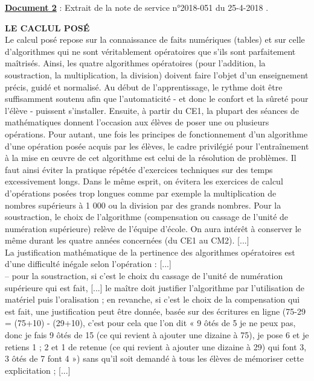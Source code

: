 \bigskip


{\bf\uline{Document 2}} : Extrait de la note de service n°2018-051 du 25-4-2018  \fg.

\begin{center}
   \begin{minipage}{15cm}
         \textsf{{\bf LE CACLUL POSÉ} \\
         Le calcul posé repose sur la connaissance de faits numériques (tables) et sur celle d'algorithmes qui ne sont véritablement opératoires que s'ils sont parfaitement maîtrisés.
Ainsi, les quatre algorithmes opératoires (pour l'addition, la soustraction, la multiplication, la division) doivent faire l'objet d'un enseignement précis, guidé et normalisé. Au début de l'apprentissage, le rythme doit être suffisamment soutenu afin que l'automaticité - et donc le confort et la sûreté pour l'élève - puissent s'installer. Ensuite, à partir du CE1, la plupart des séances de mathématiques donnent l'occasion aux élèves de poser une ou plusieurs opérations.
Pour autant, une fois les principes de fonctionnement d'un algorithme d'une opération posée acquis par les élèves, le cadre privilégié pour l'entraînement à la mise en œuvre de cet algorithme est celui de la résolution de problèmes. Il faut ainsi éviter la pratique répétée d'exercices techniques sur des temps excessivement longs. Dans le même esprit, on évitera les exercices de calcul d'opérations posées trop longues comme par exemple la multiplication de nombres supérieurs à 1 000 ou la division par des grands nombres.
Pour la soustraction, le choix de l'algorithme (compensation ou cassage de l'unité de numération supérieure) relève de l'équipe d'école. On aura intérêt à conserver le même durant les quatre années concernées (du CE1 au CM2). [...] \\
         La justification mathématique de la pertinence des algorithmes opératoires est d'une difficulté inégale selon l'opération : [...] \\
         -- pour la soustraction, si c'est le choix du cassage de l'unité de numération supérieure qui est fait, [...] le maître doit justifier l'algorithme par l'utilisation de matériel puis l'oralisation ; en revanche, si c'est le choix de la compensation qui est fait, une justification peut être donnée, basée sur des écritures en ligne (75-29 = (75+10) - (29+10), c'est pour cela que l'on dit « 9 ôtés de 5 je ne peux pas, donc je fais 9 ôtés de 15 (ce qui revient à ajouter une dizaine à 75), je pose 6 et je retiens 1 ; 2 et 1 de retenue (ce qui revient à ajouter une dizaine à 29) qui font 3, 3 ôtés de 7 font 4 ») sans qu'il soit demandé à tous les élèves de mémoriser cette explicitation ; [...] \\ [2mm]
}
\end{minipage}
\end{center}
